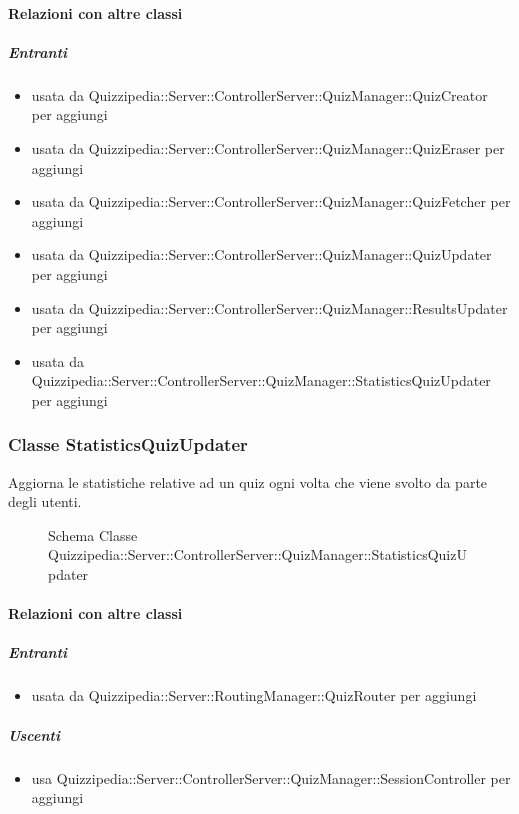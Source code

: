 \paragraph{Relazioni con altre classi}
\subparagraph{Entranti}
\begin{itemize}
\item usata da Quizzipedia::Server::ControllerServer::QuizManager::QuizCreator per aggiungi
\item usata da Quizzipedia::Server::ControllerServer::QuizManager::QuizEraser per aggiungi
\item usata da Quizzipedia::Server::ControllerServer::QuizManager::QuizFetcher per aggiungi
\item usata da Quizzipedia::Server::ControllerServer::QuizManager::QuizUpdater per aggiungi
\item usata da Quizzipedia::Server::ControllerServer::QuizManager::ResultsUpdater per aggiungi
\item usata da Quizzipedia::Server::ControllerServer::QuizManager::StatisticsQuizUpdater per aggiungi
\end{itemize}
\subsubsection{Classe StatisticsQuizUpdater}
Aggiorna le statistiche relative ad un quiz ogni volta che viene svolto da parte degli utenti.
\begin{figure}[H]
\centering
\noindent{}
\caption[Schema Classe StatisticsQuizUpdater]{Schema Classe Quizzipedia::Server::ControllerServer::QuizManager::StatisticsQuizUpdater}
\end{figure}
\paragraph{Relazioni con altre classi}
\subparagraph{Entranti}
\begin{itemize}
\item usata da Quizzipedia::Server::RoutingManager::QuizRouter per aggiungi
\end{itemize}
\subparagraph{Uscenti}
\begin{itemize}
\item usa Quizzipedia::Server::ControllerServer::QuizManager::SessionController per aggiungi
\end{itemize}
